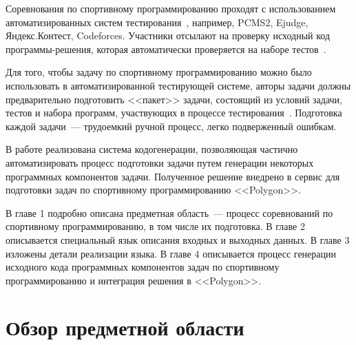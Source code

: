 \documentclass[times,specification,annotation]{style/itmo-student-thesis/itmo-student-thesis}
\begin{document}




\newcommand{\TheOnlyTruePageStyle}{fancy}
\pagestyle{\TheOnlyTruePageStyle}
\renewcommand{\headrulewidth}{0pt}
\renewcommand{\footrulewidth}{0pt}
\lhead{}
\chead{\thepage}
\rhead{}
\lfoot{}
\cfoot{}
\rfoot{}
\addtolength{\voffset}{3mm}
\addtolength{\headsep}{-3mm}

\setcounter{page}{4}
\pretocmd{\tableofcontents}{\begingroup\banhyphens}{}{}
\apptocmd{\tableofcontents}{\endgroup}{}{}

\tableofcontents

\startprefacepage

Соревнования по спортивному программированию проходят с использованием автоматизированных систем тестирования~\cite{korneev-elizarov-pcms}, например, PCMS2, Ejudge, Яндекс.Контест, Codeforces. Участники отсылают на проверку исходный код программы-решения, которая автоматически проверяется на наборе тестов~\cite{competative-prog-wiki}.

Для того, чтобы задачу по спортивному программированию можно было использовать в автоматизированной тестирующей системе, авторы задачи должны предварительно подготовить <<пакет>> задачи, состоящий из условий задачи, тестов и набора программ, участвующих в процессе тестирования~\cite{darkcyan-polygon-tutorial}. Подготовка каждой задачи~--- трудоемкий ручной процесс, легко подверженный ошибкам.

В работе реализована система кодогенерации, позволяющая частично автоматизировать процесс подготовки задачи путем генерации некоторых программных компонентов задачи. Полученное решение внедрено в сервис для подготовки задач по спортивному программированию <<Polygon>>.

В главе 1 подробно описана предметная область~--- процесс соревнований по спортивному программированию, в том числе их подготовка. В главе 2 описывается специальный язык описания входных и выходных данных. В главе 3 изложены детали реализации языка. В главе 4 описывается процесс генерации исходного кода программных компонентов задач по спортивному программированию и интеграция решения в <<Polygon>>.

\chapter{Обзор предметной области}
\end{document}
